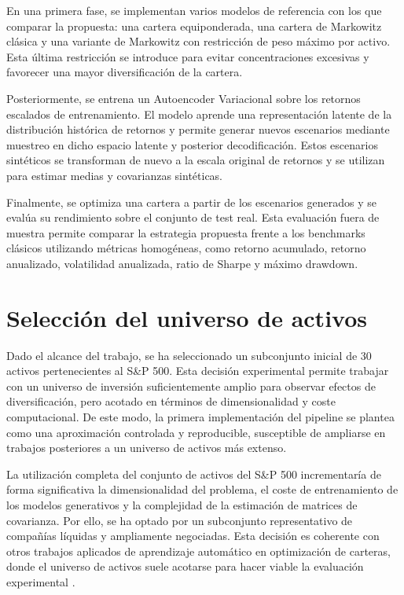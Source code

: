 En una primera fase, se implementan varios modelos de referencia con los que comparar la propuesta: una cartera equiponderada, una cartera de Markowitz clásica y una variante de Markowitz con restricción de peso máximo por activo. Esta última restricción se introduce para evitar concentraciones excesivas y favorecer una mayor diversificación de la cartera.

Posteriormente, se entrena un Autoencoder Variacional sobre los retornos escalados de entrenamiento. El modelo aprende una representación latente de la distribución histórica de retornos y permite generar nuevos escenarios mediante muestreo en dicho espacio latente y posterior decodificación. Estos escenarios sintéticos se transforman de nuevo a la escala original de retornos y se utilizan para estimar medias y covarianzas sintéticas.

Finalmente, se optimiza una cartera a partir de los escenarios generados y se evalúa su rendimiento sobre el conjunto de test real. Esta evaluación fuera de muestra permite comparar la estrategia propuesta frente a los benchmarks clásicos utilizando métricas homogéneas, como retorno acumulado, retorno anualizado, volatilidad anualizada, ratio de Sharpe y máximo drawdown.

\section{Selección del universo de activos}

Dado el alcance del trabajo, se ha seleccionado un subconjunto inicial de 30 activos pertenecientes al S\&P 500. Esta decisión experimental permite trabajar con un universo de inversión suficientemente amplio para observar efectos de diversificación, pero acotado en términos de dimensionalidad y coste computacional. De este modo, la primera implementación del pipeline se plantea como una aproximación controlada y reproducible, susceptible de ampliarse en trabajos posteriores a un universo de activos más extenso.

La utilización completa del conjunto de activos del S\&P 500 incrementaría de forma significativa la dimensionalidad del problema, el coste de entrenamiento de los modelos generativos y la complejidad de la estimación de matrices de covarianza. Por ello, se ha optado por un subconjunto representativo de compañías líquidas y ampliamente negociadas. Esta decisión es coherente con otros trabajos aplicados de aprendizaje automático en optimización de carteras, donde el universo de activos suele acotarse para hacer viable la evaluación experimental \cite{zhang2020deep}.

